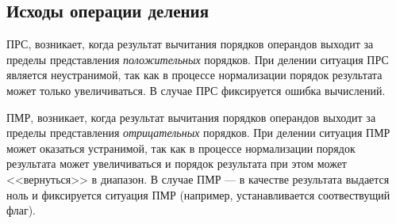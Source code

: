 \subsection{Исходы операции деления}


ПРС, возникает, когда результат вычитания порядков операндов выходит за пределы представления \emph{положительных} порядков. При делении ситуация ПРС является неустранимой, так как в процессе нормализации порядок результата может только увеличиваться. В случае ПРС фиксируется ошибка вычислений.

ПМР, возникает, когда результат вычитания порядков операндов выходит за пределы представления \emph{отрицательных} порядков. При делении ситуация ПМР может оказаться устранимой, так как в процессе нормализации порядок результата может увеличиваться и порядок результата при этом может <<вернуться>> в диапазон. В случае ПМР --- в качестве результата выдается ноль и фиксируется ситуация ПМР (например, устанавливается соотвествущий флаг).
